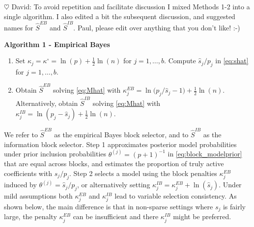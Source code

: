 \documentclass[aos]{imsart}
\theoremstyle{plain}
\newcommand{\david}[1]{{\small{\color{blue} \sf $\heartsuit$ David: #1}}}
\newcommand{\M}{\mathcal{M}}
\newcommand{\bs}{\boldsymbol}
\begin{document}
\david{To avoid repetition and facilitate discussion I mixed Methods 1-2 into a single algorithm. I also edited a bit the subsequent discussion, and suggested names for $\hat{S}^{EB}$ and $\hat{S}^{IB}$. Paul, please edit over anything that you don't like! :-)}

\textbf{Algorithm 1 - Empirical Bayes}
\begin{enumerate}
    \item Set %
    $\kappa_j=\kappa^{\circ}=\ln(p)+\frac{1}{2}\ln(n)$ for $j=1,\ldots,b$. Compute $\widehat{s}_j/p_j$ in \eqref{eq:shat} for $j=1,\ldots,b$.

    \item Obtain $\hat{S}^{EB}$ solving \eqref{eq:Mhat} with $\kappa_j^{EB}= \ln\bigg(p_j/\widehat{s}_j -1\bigg)+ \tfrac{1}{2}\ln(n)$.
    Alternatively, obtain $\hat{S}^{IB}$ solving \eqref{eq:Mhat} with
    $\kappa_j^{IB} = \ln(p_j-\widehat{s}_j)+ \tfrac{1}{2}\ln(n)$.
\end{enumerate}

We refer to $\hat{S}^{EB}$ as the empirical Bayes block selector, and to $\hat{S}^{IB}$ as the information block selector.
Step 1 approximates posterior model probabilities under prior inclusion probabilities $\theta^{(j)}=(p+1)^{-1}$ in \eqref{eq:block_modelprior} that are equal across blocks, and estimates the proportion of truly active coefficients with $\hat{s}_j/p_j$. Step 2 selects a model using the block penalties $\kappa_j^{EB}$ induced by $\theta^{(j)}=\hat{s}_j/p_j$, %
or alternatively setting $\kappa_j^{IB}= \kappa_j^{EB} + \ln(\hat{s}_j)$.
Under mild assumptions both $\kappa_j^{EB}$ and $\kappa_j^{IB}$ lead to variable selection consistency.
As shown below, the main difference is that in non-sparse settings where $s_j$ is fairly large, the penalty $\kappa_j^{EB}$ can be insufficient and there $\kappa_j^{IB}$ might be preferred. %
\end{document}
